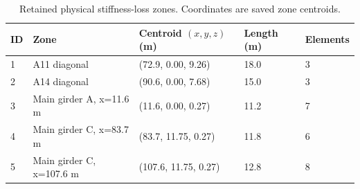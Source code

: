 \begin{table}[htbp]
\centering
\small
\setlength{\tabcolsep}{4pt}
\caption{Retained physical stiffness-loss zones. Coordinates are saved zone centroids.}
\label{tab:kw51-retained-zones}
\begin{tabular}{@{}lllll@{}}
\toprule
ID & Zone & Centroid $(x,y,z)$ (m) & Length (m) & Elements \\
\midrule
1 & A11 diagonal & (72.9, 0.00, 9.26) & 18.0 & 3 \\
2 & A14 diagonal & (90.6, 0.00, 7.68) & 15.0 & 3 \\
3 & Main girder A, x=11.6 m & (11.6, 0.00, 0.27) & 11.2 & 7 \\
4 & Main girder C, x=83.7 m & (83.7, 11.75, 0.27) & 11.8 & 6 \\
5 & Main girder C, x=107.6 m & (107.6, 11.75, 0.27) & 12.8 & 8 \\
\bottomrule
\end{tabular}
\end{table}

